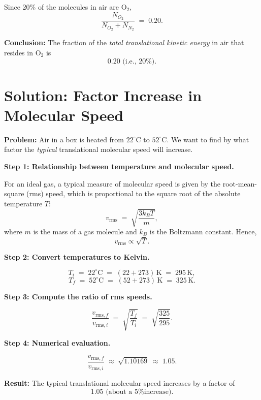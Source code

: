 \documentclass[12pt]{article}
\theoremstyle{definition} %
\theoremstyle{plain} %
\begin{document}
Since 20\% of the molecules in air are O$_2$, 
\[
\frac{N_{O_2}}{N_{O_2} + N_{N_2}}
\;=\; 0.20.
\]

\vspace{1em}
\noindent
\textbf{Conclusion:} 
The fraction of the \emph{total translational kinetic energy} in air that resides in O$_2$ is 
\[
\boxed{0.20 \text{ (i.e., 20\%)}}.
\]

\section*{Solution: Factor Increase in Molecular Speed}

\noindent
\textbf{Problem:} 
Air in a box is heated from $22^\circ\mathrm{C}$ to $52^\circ\mathrm{C}$. We want to find by what factor the \emph{typical} translational molecular speed will increase.

\vspace{1em}
\noindent
\textbf{Step 1: Relationship between temperature and molecular speed.}

For an ideal gas, a typical measure of molecular speed is given by the root-mean-square (rms) speed, which is proportional to the square root of the absolute temperature $T$:
\[
v_\mathrm{rms} \;=\; \sqrt{\frac{3k_B T}{m}},
\]
where $m$ is the mass of a gas molecule and $k_B$ is the Boltzmann constant. Hence,
\[
v_\mathrm{rms} \propto \sqrt{T}.
\]

\vspace{1em}
\noindent
\textbf{Step 2: Convert temperatures to Kelvin.}

\[
T_i \;=\; 22^\circ\mathrm{C} \;=\; (22 + 273)\,\mathrm{K} \;=\; 295\,\mathrm{K},
\]
\[
T_f \;=\; 52^\circ\mathrm{C} \;=\; (52 + 273)\,\mathrm{K} \;=\; 325\,\mathrm{K}.
\]

\vspace{1em}
\noindent
\textbf{Step 3: Compute the ratio of rms speeds.}

\[
\frac{v_{\mathrm{rms},f}}{v_{\mathrm{rms},i}}
\;=\;
\sqrt{\frac{T_f}{T_i}}
\;=\;
\sqrt{\frac{325}{295}}.
\]

\vspace{1em}
\noindent
\textbf{Step 4: Numerical evaluation.}

\[
\frac{v_{\mathrm{rms},f}}{v_{\mathrm{rms},i}}
\;\approx\;
\sqrt{1.10169}
\;\approx\;
1.05.
\]

\vspace{1em}
\noindent
\textbf{Result:} 
The typical translational molecular speed increases by a factor of 
\[
\boxed{1.05 \text{ (about a 5\% increase).}}
\]
\end{document}
